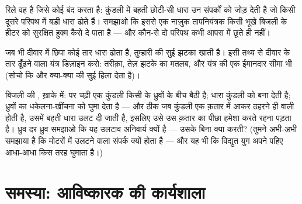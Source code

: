 \begin{exercise}[$\star\star$]\label{exo:g8:electric-current-effects:10}
रिले वह  है जिसे कोई  बंद करता है: कुंडली में बहती
छोटी-सी धारा उन संपर्कों को जोड़ देती है जो किसी दूसरे परिपथ में बड़ी
धारा ढोते हैं। समझाओ कि इससे एक नाज़ुक तापनियंत्रक किसी भूखे बिजली के
हीटर को सुरक्षित हुक्म कैसे दे पाता है --- और कौन-से दो परिपथ कभी
आपस में छूते ही नहीं।
\end{exercise}

\begin{exercise}[$\star\star$]\label{exo:g8:electric-current-effects:11}
जब भी दीवार में छिपा कोई तार धारा ढोता है, तुम्हारी  की सुई
झटका खाती है। इसी तथ्य से दीवार के तार ढूँढ़ने वाला यंत्र डिज़ाइन करो:
तरीक़ा, तेज़ झटके का मतलब, और यंत्र की एक ईमानदार सीमा भी (सोचो कि और
क्या-क्या  की सुई हिला देता है)।
\end{exercise}

\begin{exercise}[$\star\star\star$]\label{exo:g8:electric-current-effects:12}
बिजली की , ख़ाके में:  पर चढ़ी एक कुंडली किसी  के ध्रुवों
के बीच बैठी है; धारा कुंडली को  बना देती है; ध्रुवों का
धकेलना-खींचना  को घुमा देता है --- और ठीक जब कुंडली एक क़तार में
आकर ठहरने ही वाली होती है, उसमें बहती धारा उलट दी जाती है, इसलिए उसे
उस क़तार का पीछा हमेशा करते रहना पड़ता है। ध्रुव दर ध्रुव समझाओ कि यह
उलटाव अनिवार्य क्यों है --- उसके बिना  क्या करती? (तुमने अभी-अभी
समझाया है कि मोटरों में उलटने वाला संपर्क क्यों होता है --- और यह भी
कि विद्युत युग अपने पहिए आधा-आधा किस तरह घुमाता है।)
\end{exercise}

\section{समस्या: आविष्कारक की कार्यशाला}

